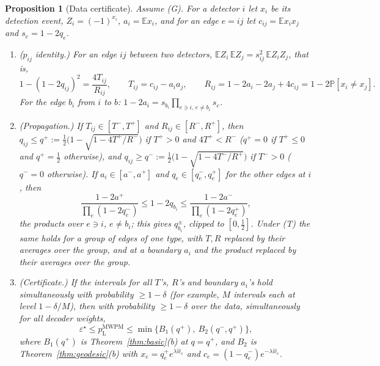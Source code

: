 \documentclass[11pt]{article}
\theoremstyle{plain}
\newtheorem{proposition}{Proposition}
\theoremstyle{definition}
\theoremstyle{remark}
\newcommand{\Prob}{\mathbb{P}}
\newcommand{\E}{\mathbb{E}}
\newcommand{\pM}{p_{\mathrm{L}}^{\mathrm{MWPM}}}
\newcommand{\err}{\varepsilon^{\star}}
\newcommand{\hw}{\hat w}
\renewcommand{\_}{\oldunderscore\allowbreak}
\begin{document}
\begin{proposition}[Data certificate]\label{prop:data-cert}
Assume (G). For a detector $i$ let $x_i$ be its detection event, $Z_i=(-1)^{x_i}$, $a_i=\E x_i$, and for an edge $e=ij$ let $c_{ij}=\E x_ix_j$ and $s_e=1-2q_e$.
\begin{enumerate}[label=(\alph*),leftmargin=*]
\item ($p_{ij}$ identity.) For an edge $ij$ between two detectors, $\E Z_i\,\E Z_j=s_{ij}^2\,\E Z_iZ_j$, that is,
\[
1-(1-2q_{ij})^2=\frac{4T_{ij}}{R_{ij}},\qquad T_{ij}=c_{ij}-a_ia_j,\qquad R_{ij}=1-2a_i-2a_j+4c_{ij}=1-2\Prob[x_i\ne x_j].
\]
For the edge $b_i$ from $i$ to $b$: $1-2a_i=s_{b_i}\prod_{e\ni i,\,e\ne b_i}s_e$.
\item (Propagation.) If $T_{ij}\in[T^-,T^+]$ and $R_{ij}\in[R^-,R^+]$, then $q_{ij}\le q^+:=\frac12\big(1-\sqrt{1-4T^+/R^-}\big)$ if $T^+>0$ and $4T^+<R^-$ ($q^+=0$ if $T^+\le0$ and $q^+=\tfrac12$ otherwise), and $q_{ij}\ge q^-:=\frac12\big(1-\sqrt{1-4T^-/R^+}\big)$ if $T^->0$ ($q^-=0$ otherwise). If $a_i\in[a^-,a^+]$ and $q_e\in[q_e^-,q_e^+]$ for the other edges at $i$, then
\[
\frac{1-2a^+}{\prod_{e}(1-2q_e^-)}\le1-2q_{b_i}\le\frac{1-2a^-}{\prod_{e}(1-2q_e^+)},
\]
the products over $e\ni i$, $e\ne b_i$; this gives $q_{b_i}^\pm$, clipped to $[0,\tfrac12]$. Under (T) the same holds for a group of edges of one type, with $T,R$ replaced by their averages over the group, and at a boundary $a_i$ and the product replaced by their averages over the group.
\item (Certificate.) If the intervals for all $T$'s, $R$'s and boundary $a_i$'s hold simultaneously with probability $\ge1-\delta$ (for example, $M$ intervals each at level $1-\delta/M$), then with probability $\ge1-\delta$ over the data, simultaneously for all decoder weights,
\[
\err\le\pM\le\min\big\{B_1(q^+),\ B_2(q^-,q^+)\big\},
\]
where $B_1(q^+)$ is Theorem~\ref{thm:basic}(b) at $q=q^+$, and $B_2$ is Theorem~\ref{thm:geodesic}(b) with $x_e=q_e^+e^{\lambda\hw_e}$ and $c_e=(1-q_e^-)e^{-\lambda\hw_e}$.
\end{enumerate}
\end{proposition}
\end{document}
